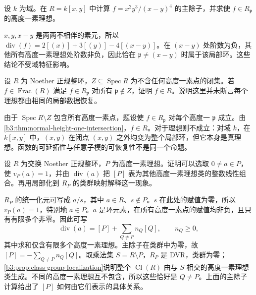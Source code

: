 \begin{exercise}\label{b3:ex:20-fraction-divisor}
	设 \(k\) 为域。在 \(R=k[x,y]\) 中计算 \(f=x^2y^3/(x-y)^4\) 的主除子，并求使 \(f\in R_{\mathfrak p}\) 的高度一素理想。
\end{exercise}
\begin{solution}
	\(x,y,x-y\) 是两两不相伴的素元，所以 \(\operatorname{div}(f)=2[(x)]+3[(y)]-4[(x-y)]\)。在 \((x-y)\) 处阶数为负，其他所有高度一素理想处阶数非负，因此恰在 \(\mathfrak p\ne(x-y)\) 时属于该局部环。这些结论不受域特征影响。
\end{solution}

\begin{exercise}\label{b3:ex:20-remove-codimension-two}
	设 \(R\) 为 Noether 正规整环，\(Z\subseteq\operatorname{Spec}R\) 为不含任何高度一素点的闭集。若 \(f\in\operatorname{Frac}(R)\) 满足 \(f\in R_{\mathfrak p}\) 对所有 \(\mathfrak p\notin Z\)，证明 \(f\in R\)。说明这里并未断言每个理想都由相同的局部数据恢复。
\end{exercise}
\begin{solution}
	由于 \(\operatorname{Spec}R\setminus Z\) 包含所有高度一素点，题设使 \(f\in R_{\mathfrak p}\) 对每个高度一 \(\mathfrak p\) 成立。由\cref{b3:thm:normal-height-one-intersection}，\(f\in R\)。对于理想则不成立：对域 \(k\)，在 \(k[x,y]\) 中，\((x,y)\) 在闭点 \((x,y)\) 之外均变为整个局部环，但它本身是真理想。函数的可延拓性与任意子模的可恢复性不是同一个命题。
\end{solution}

\begin{exercise}\label{b3:ex:20-localization-class-group}
	设 \(R\) 为交换 Noether 正规整环，\(P\) 为高度一素理想。证明可以选取 \(0\ne a\in P\)，使 \(v_P(a)=1\)，并由 \(\operatorname{div}(a)\) 把 \([P]\) 表为其他高度一素理想类的整数线性组合。再用局部化到 \(R_P\) 的类群映射解释这一现象。
\end{exercise}
\begin{solution}
	\(R_P\) 的统一化元可写成 \(a/s\)，其中 \(a\in R\)、\(s\notin P\)。\(s\) 在此处的赋值为零，所以 \(v_P(a)=1\)，特别地 \(a\in P\)。\(a\) 是环元素，在所有高度一素点的赋值均非负，且只有有限多个非零。因此可写
	\[
		\operatorname{div}(a)=[P]+\sum_{Q\ne P}n_Q[Q],\qquad n_Q\ge0,
	\]
	其中求和仅含有限多个高度一素理想。主除子在类群中为零，故 \([P]=-\sum_{Q\ne P}n_Q[Q]\)。取乘法集 \(S=R\setminus P\)，\(R_P\) 是 DVR，类群为零；\cref{b3:prop:class-group-localization}说明整个 \(\operatorname{Cl}(R)\) 由与 \(S\) 相交的高度一素理想类生成。不同的高度一素理想互不包含，所以这些恰好是 \(Q\ne P\)。上面的主除子计算给出了 \([P]\) 如何由它们表示的具体关系。
\end{solution}

